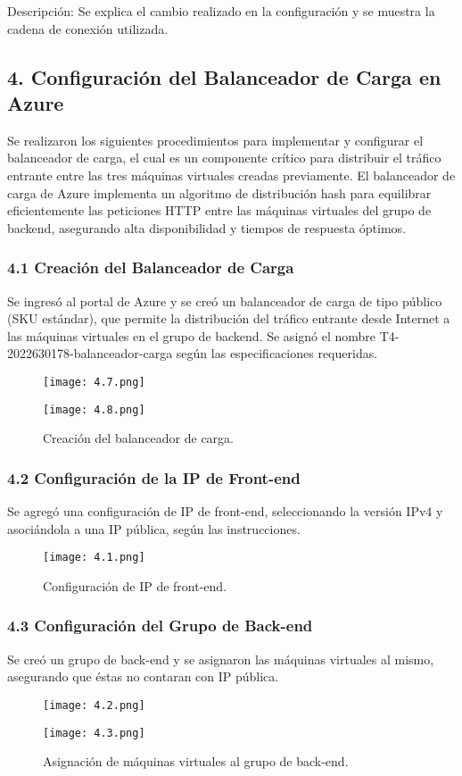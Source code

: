\documentclass[12pt]{article}
\begin{document}
Descripción: Se explica el cambio realizado en la configuración y se muestra la cadena de conexión utilizada.

\subsection*{4. Configuración del Balanceador de Carga en Azure}
Se realizaron los siguientes procedimientos para implementar y configurar el balanceador de carga, el cual es un componente crítico para distribuir el tráfico entrante entre las tres máquinas virtuales creadas previamente. El balanceador de carga de Azure implementa un algoritmo de distribución hash para equilibrar eficientemente las peticiones HTTP entre las máquinas virtuales del grupo de backend, asegurando alta disponibilidad y tiempos de respuesta óptimos.

\subsubsection{4.1 Creación del Balanceador de Carga}
Se ingresó al portal de Azure y se creó un balanceador de carga de tipo público (SKU estándar), que permite la distribución del tráfico entrante desde Internet a las máquinas virtuales en el grupo de backend. Se asignó el nombre T4-2022630178-balanceador-carga según las especificaciones requeridas.
\begin{figure}[H]
    \centering
    \texttt{[image: 4.7.png]}
\end{figure}
\begin{figure}[H]
    \centering
    \texttt{[image: 4.8.png]}
    \caption{Creación del balanceador de carga.}
\end{figure}

\subsubsection{4.2 Configuración de la IP de Front-end}
Se agregó una configuración de IP de front-end, seleccionando la versión IPv4 y asociándola a una IP pública, según las instrucciones.
\begin{figure}[H]
    \centering
    \texttt{[image: 4.1.png]}
    \caption{Configuración de IP de front-end.}
\end{figure}

\subsubsection{4.3 Configuración del Grupo de Back-end}
Se creó un grupo de back-end y se asignaron las máquinas virtuales al mismo, asegurando que éstas no contaran con IP pública.
\begin{figure}[H]
    \centering
    \texttt{[image: 4.2.png]}
\end{figure}
\begin{figure}[H]
    \centering
    \texttt{[image: 4.3.png]}
    \caption{Asignación de máquinas virtuales al grupo de back-end.}
\end{figure}
\end{document}
